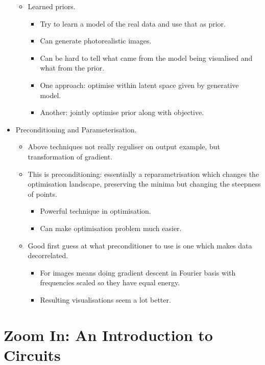 \begin{itemize}
\begin{itemize}
\begin{itemize}
        \end{itemize}
        \item Learned priors.
        \begin{itemize}
            \item Try to learn a model of the real data and use that as prior.
            \item Can generate photorealistic images.
            \item Can be hard to tell what came from the model being visualised and what from the prior.
            \item One approach: optimise within latent space given by generative model.
            \item Another: jointly optimise prior along with objective.
        \end{itemize}
    \end{itemize}
    \item Preconditioning and Parameterisation.
    \begin{itemize}
        \item Above techniques not really reguliser on output example, but transformation of gradient.
        \item This is preconditioning: essentially a reparametrisation which changes the optimisation landscape, preserving the minima but changing the steepness of points.
        \begin{itemize}
            \item Powerful technique in optimisation.
            \item Can make optimisation problem much easier.
        \end{itemize}
        \item Good first guess at what preconditioner to use is one which makes data decorrelated.
        \begin{itemize}
            \item For images means doing gradient descent in Fourier basis with frequencies scaled so they have equal energy.
            \item Resulting visualisations seem a lot better.
        \end{itemize}
    \end{itemize}
\end{itemize}


\section{Zoom In: An Introduction to Circuits}

